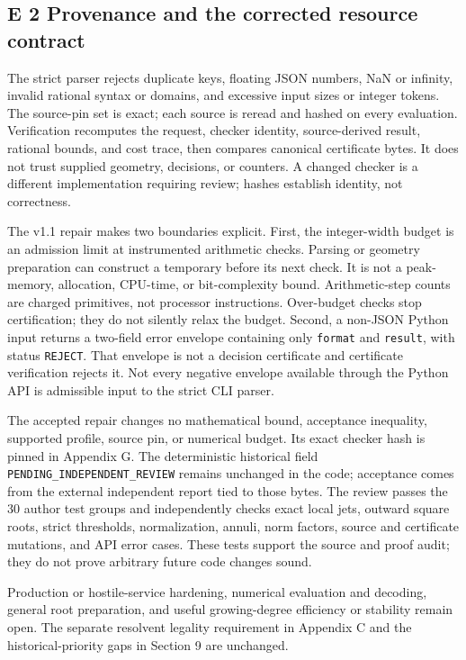 \documentclass[
  11pt,
]{article}
\begin{document}
\subsection{E 2 Provenance and the corrected resource contract}

The strict parser rejects duplicate keys, floating JSON numbers,
NaN or infinity, invalid rational syntax or domains, and excessive input
sizes or integer tokens. The source-pin set is exact; each source is
reread and hashed on every evaluation. Verification recomputes the request,
checker identity, source-derived result, rational bounds, and cost trace,
then compares canonical certificate bytes. It does not trust supplied
geometry, decisions, or counters. A changed checker is a different
implementation requiring review; hashes establish identity, not correctness.

The v1.1 repair makes two boundaries explicit. First, the integer-width
budget is an admission limit at instrumented arithmetic checks. Parsing
or geometry preparation can construct a temporary before its next check.
It is not a peak-memory, allocation, CPU-time, or bit-complexity bound.
Arithmetic-step counts are charged primitives, not processor instructions.
Over-budget checks stop certification; they do not silently relax the budget.
Second, a non-JSON Python input returns a two-field error envelope containing
only \texttt{format} and \texttt{result}, with status \texttt{REJECT}.
That envelope is not a decision certificate and certificate verification
rejects it. Not every negative envelope available through the Python API
is admissible input to the strict CLI parser.

The accepted repair changes no mathematical bound, acceptance inequality,
supported profile, source pin, or numerical budget. Its exact checker hash
is pinned in Appendix G. The deterministic historical field
\texttt{PENDING\_INDEPENDENT\_REVIEW} remains unchanged in the code;
acceptance comes from the external independent report tied to those bytes.
The review passes the 30 author test groups and independently checks exact
local jets, outward square roots, strict thresholds, normalization,
annuli, norm factors, source and certificate mutations, and API error cases.
These tests support the source and proof audit; they do not prove arbitrary
future code changes sound.

Production or hostile-service hardening, numerical evaluation and decoding,
general root preparation, and useful growing-degree efficiency or stability
remain open. The separate resolvent legality requirement in Appendix C and
the historical-priority gaps in Section 9 are unchanged.
\end{document}
